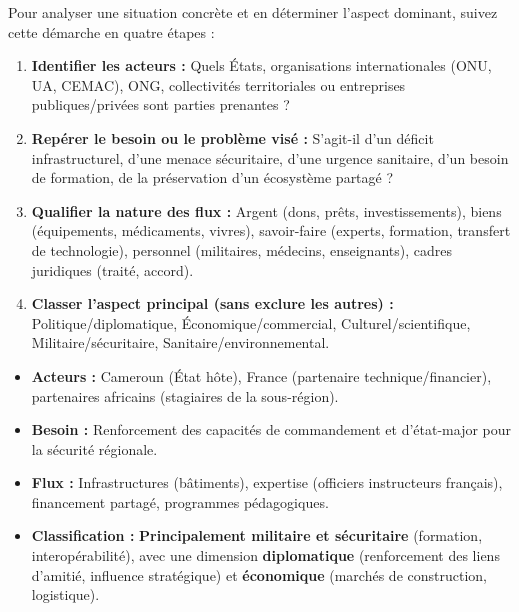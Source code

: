 \documentclass[11pt]{article}
\begin{document}
\begin{methode}
Pour analyser une situation concrète et en déterminer l'aspect dominant, suivez cette démarche en quatre étapes :
\begin{enumerate}
    \item \textbf{Identifier les acteurs :} Quels États, organisations internationales (ONU, UA, CEMAC), ONG, collectivités territoriales ou entreprises publiques/privées sont parties prenantes ?
    \item \textbf{Repérer le besoin ou le problème visé :} S'agit-il d'un déficit infrastructurel, d'une menace sécuritaire, d'une urgence sanitaire, d'un besoin de formation, de la préservation d'un écosystème partagé ?
    \item \textbf{Qualifier la nature des flux :} Argent (dons, prêts, investissements), biens (équipements, médicaments, vivres), savoir-faire (experts, formation, transfert de technologie), personnel (militaires, médecins, enseignants), cadres juridiques (traité, accord).
    \item \textbf{Classer l'aspect principal (sans exclure les autres) :} Politique/diplomatique, Économique/commercial, Culturel/scientifique, Militaire/sécuritaire, Sanitaire/environnemental.
\end{enumerate}
\end{methode}

\begin{exemplebox}
\begin{itemize}
    \item \textbf{Acteurs :} Cameroun (État hôte), France (partenaire technique/financier), partenaires africains (stagiaires de la sous-région).
    \item \textbf{Besoin :} Renforcement des capacités de commandement et d'état-major pour la sécurité régionale.
    \item \textbf{Flux :} Infrastructures (bâtiments), expertise (officiers instructeurs français), financement partagé, programmes pédagogiques.
    \item \textbf{Classification :} \textbf{Principalement militaire et sécuritaire} (formation, interopérabilité), avec une dimension \textbf{diplomatique} (renforcement des liens d'amitié, influence stratégique) et \textbf{économique} (marchés de construction, logistique).
\end{itemize}
\end{exemplebox}
\end{document}
